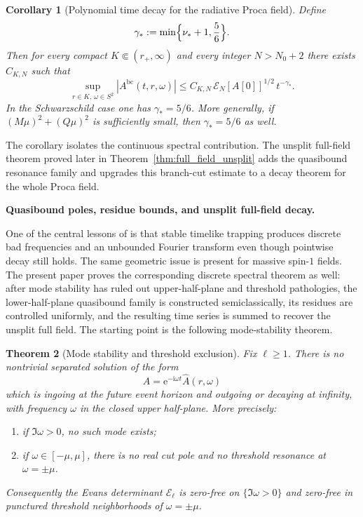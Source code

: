 \documentclass[12pt]{article}
\numberwithin{equation}{section}
\theoremstyle{plain}
\newtheorem{theorem}{Theorem}[section]
\newtheorem{corollary}[theorem]{Corollary}
\theoremstyle{definition}
\theoremstyle{remark}
\newcommand{\ii}{\mathrm i}
\newcommand{\ee}{\mathrm e}
\newcommand{\bc}{\mathrm{bc}}
\newcommand{\cE}{\mathcal E}
\newcommand{\om}{\omega}
\newcommand{\abs}[1]{\left|#1\right|}
\begin{document}
\begin{corollary}[Polynomial time decay for the radiative Proca field]\label{cor:poly_decay_radiative}
Define
\[
   \gamma_*:=\min\Bigl\{\nu_*+1,\frac56\Bigr\}.
\]
Then for every compact $K\Subset(r_+,\infty)$ and every integer $N>N_0+2$ there exists $C_{K,N}$ such that
\begin{equation}\label{eq:intro_poly_decay_radiative}
   \sup_{r\in K,\,\omega\in S^2}\abs{A^{\bc}(t,r,\omega)}
   \le
   C_{K,N}\,\mathcal E_N[A[0]]^{1/2}\,t^{-\gamma_*}.
\end{equation}
In the Schwarzschild case one has $\gamma_*=5/6$.  More generally, if $(M\mu)^2+(Q\mu)^2$ is sufficiently small, then $\gamma_*=5/6$ as well.
\end{corollary}

The corollary isolates the continuous spectral contribution.  The unsplit full-field theorem proved later in Theorem~\ref{thm:full_field_unsplit} adds the quasibound resonance family and upgrades this branch-cut estimate to a decay theorem for the whole Proca field.


\medskip\noindent\textbf{Quasibound poles, residue bounds, and unsplit full-field decay.}\par\smallskip\noindent
One of the central lessons of \cite{ShlapentokhRothmanVanDeMoortel2026} is that stable timelike trapping produces discrete bad frequencies and an unbounded Fourier transform even though pointwise decay still holds.  The same geometric issue is present for massive spin-$1$ fields.  The present paper proves the corresponding discrete spectral theorem as well: after mode stability has ruled out upper-half-plane and threshold pathologies, the lower-half-plane quasibound family is constructed semiclassically, its residues are controlled uniformly, and the resulting time series is summed to recover the unsplit full field.  The starting point is the following mode-stability theorem.

\begin{theorem}[Mode stability and threshold exclusion]\label{thm:mode_stability}
Fix $\ell\ge1$.  There is no nontrivial separated solution of the form
\[
   A=\ee^{-\ii\om t}\widehat A(r,\omega)
\]
which is ingoing at the future event horizon and outgoing or decaying at infinity, with frequency $\om$ in the closed upper half-plane.  More precisely:
\begin{enumerate}[label=\textnormal{(\roman*)}]
   \item if $\Im\om>0$, no such mode exists;
   \item if $\om\in[-\mu,\mu]$, there is no real cut pole and no threshold resonance at $\om=\pm\mu$.
\end{enumerate}
Consequently the Evans determinant $\cE_\ell$ is zero-free on $\{\Im\om>0\}$ and zero-free in punctured threshold neighborhoods of $\om=\pm\mu$.
\end{theorem}
\end{document}
